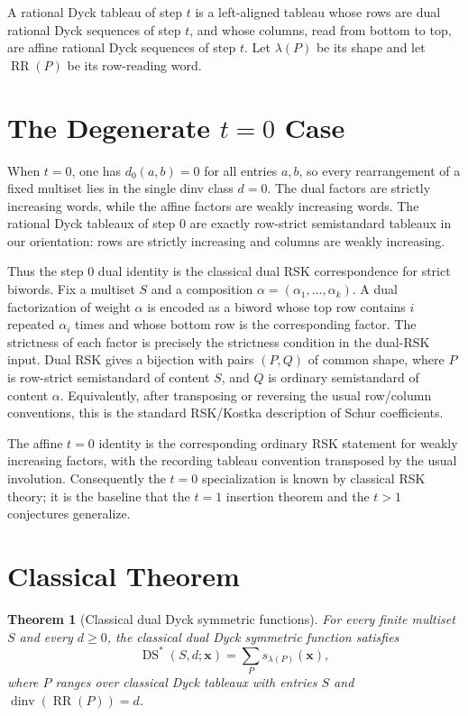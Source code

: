 \documentclass{article}
\newcommand{\dinv}{\operatorname{dinv}}
\newcommand{\DSstar}{\operatorname{DS}^{\ast}}
\newtheorem{theorem}{Theorem}
\begin{document}
A rational Dyck tableau of step \(t\) is a left-aligned tableau whose rows are
dual rational Dyck sequences of step \(t\), and whose columns, read from
bottom to top, are affine rational Dyck sequences of step \(t\).  Let
\(\lambda(P)\) be its shape and let \(\operatorname{RR}(P)\) be its
row-reading word.

\section{The Degenerate \(t=0\) Case}

When \(t=0\), one has \(d_0(a,b)=0\) for all entries \(a,b\), so every
rearrangement of a fixed multiset lies in the single dinv class \(d=0\).
The dual factors are strictly increasing words, while the affine factors are
weakly increasing words.  The rational Dyck tableaux of step \(0\) are exactly
row-strict semistandard tableaux in our orientation: rows are strictly
increasing and columns are weakly increasing.

Thus the step \(0\) dual identity is the classical dual RSK correspondence for
strict biwords.  Fix a multiset \(S\) and a composition
\(\alpha=(\alpha_1,\ldots,\alpha_k)\).  A dual factorization of weight
\(\alpha\) is encoded as a biword whose top row contains \(i\) repeated
\(\alpha_i\) times and whose bottom row is the corresponding factor.  The
strictness of each factor is precisely the strictness condition in the
dual-RSK input.  Dual RSK gives a bijection with pairs \((P,Q)\) of common
shape, where \(P\) is row-strict semistandard of content \(S\), and \(Q\) is
ordinary semistandard of content \(\alpha\).  Equivalently, after transposing
or reversing the usual row/column conventions, this is the standard
RSK/Kostka description of Schur coefficients.

The affine \(t=0\) identity is the corresponding ordinary RSK statement for
weakly increasing factors, with the recording tableau convention transposed by
the usual involution.  Consequently the \(t=0\) specialization is known by
classical RSK theory; it is the baseline that the \(t=1\) insertion theorem
and the \(t>1\) conjectures generalize.

\section{Classical Theorem}

\begin{theorem}[Classical dual Dyck symmetric functions]
For every finite multiset \(S\) and every \(d\ge0\), the classical dual Dyck
symmetric function satisfies
\[
  \DSstar(S,d;\mathbf x)
  =
  \sum_P s_{\lambda(P)}(\mathbf x),
\]
where \(P\) ranges over classical Dyck tableaux with entries \(S\) and
\(\dinv(\operatorname{RR}(P))=d\).
\end{theorem}
\end{document}
